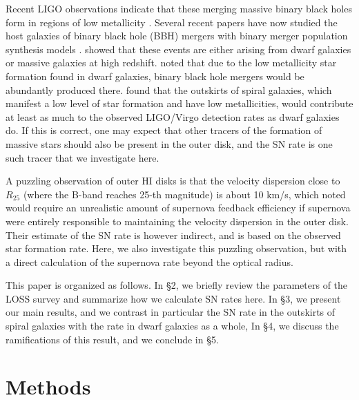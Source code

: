 \documentclass[apj]{emulateapj}
\begin{document}
Recent LIGO observations \citep{Abbott16} \citep{Abbott17}   indicate that these merging massive binary black holes form in regions of low metallicity \citep{Belczynski16}.  Several recent papers have now studied the host galaxies of binary black hole (BBH) mergers with binary merger population synthesis models \citep{Lamberts16}\citep{OShaughnessy17}\citep{Chakrabarti17}.  \citet{Lamberts16} showed that these events are either arising from dwarf galaxies or massive galaxies at high redshift. \citet{OShaughnessy17} noted that due to the low metallicity star formation found in dwarf galaxies, binary black hole mergers would be abundantly produced there.  \citet{Chakrabarti17} found that the outskirts of spiral galaxies, which manifest a low level of star formation and have low metallicities, would contribute at least as much to the observed LIGO/Virgo detection rates as dwarf galaxies do.  If this is correct, one may expect that other tracers of the formation of massive stars should also be present in the outer disk, and the SN rate is one such tracer that we investigate here.

A puzzling observation of outer HI disks is that the velocity dispersion close to $R_{25}$ (where the B-band reaches 25-th magnitude) is about 10 km/s, which \citet{Tamburro09} noted would require an unrealistic amount of supernova feedback efficiency if supernova were entirely responsible to maintaining the velocity dispersion in the outer disk.  Their estimate of the SN rate is however indirect, and is based on the observed star formation rate.  Here, we also investigate this puzzling observation, but with a direct calculation of the supernova rate beyond the optical radius.  

This paper is organized as follows.   In \S 2, we briefly review the parameters of the LOSS survey and summarize how we calculate SN rates here.  In \S 3, we present our main results, and we contrast in particular the SN rate in the outskirts of spiral galaxies with the rate in dwarf galaxies as a whole,  In \S 4, we discuss the ramifications of this result, and we conclude in \S 5.

\section{Methods}
\end{document}
